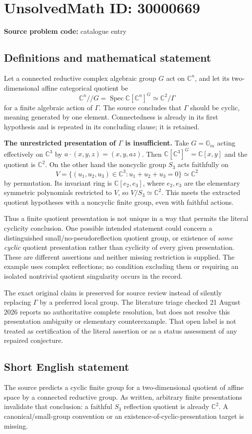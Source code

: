 \documentclass[11pt]{article}
\newcommand{\C}{\mathbb{C}}
\begin{document}
\section*{UnsolvedMath ID: 30000669}
\textbf{Source problem code:} catalogue entry
\subsection{Definitions and mathematical statement}
Let a connected reductive complex algebraic group $G$ act on $\C^n$, and let its two-dimensional affine categorical quotient be
\[
 \C^n//G=\operatorname{Spec}\C[\C^n]^G
                  \simeq\C^2/\Gamma
\]
for a finite algebraic action of $\Gamma$. The source concludes that $\Gamma$ should be cyclic, meaning generated by one element. Connectedness is already in its first hypothesis and is repeated in its concluding clause; it is retained.

\textbf{The unrestricted presentation of $\Gamma$ is insufficient.} Take $G=\mathbb G_m$ acting effectively on $\C^3$ by $a\cdot(x,y,z)=(x,y,az)$. Then $\C[\C^3]^G=\C[x,y]$ and the quotient is $\C^2$. On the other hand the noncyclic group $S_3$ acts faithfully on
\[
 V=\{(u_1,u_2,u_3)\in\C^3:u_1+u_2+u_3=0\}\simeq\C^2
\]
by permutation. Its invariant ring is $\C[e_2,e_3]$, where $e_2,e_3$ are the elementary symmetric polynomials restricted to $V$, so $V/S_3\simeq\C^2$. This meets the extracted quotient hypotheses with a noncyclic finite group, even with faithful actions.

Thus a finite quotient presentation is not unique in a way that permits the literal cyclicity conclusion. One possible intended statement could concern a distinguished small/no-pseudoreflection quotient group, or existence of \emph{some cyclic} quotient presentation rather than cyclicity of every given presentation. These are different assertions and neither missing restriction is supplied. The example uses complex reflections; no condition excluding them or requiring an isolated nontrivial quotient singularity occurs in the record.

The exact original claim is preserved for source review instead of silently replacing $\Gamma$ by a preferred local group. The literature triage checked 21 August 2026 reports no authoritative complete resolution, but does not resolve this presentation ambiguity or elementary counterexample. That open label is not treated as certification of the literal assertion or as a status assessment of any repaired conjecture.
\subsection{Short English statement}
The source predicts a cyclic finite group for a two-dimensional quotient of affine space by a connected reductive group. As written, arbitrary finite presentations invalidate that conclusion: a faithful $S_3$ reflection quotient is already $\C^2$. A canonical/small-group convention or an existence-of-cyclic-presentation target is missing.
\end{document}
